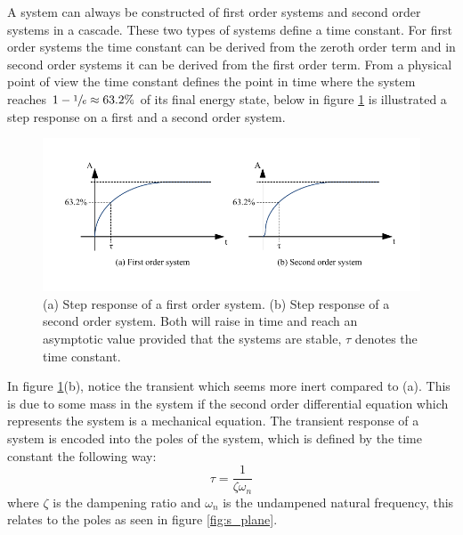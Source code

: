 A system can always be constructed of first order systems and second order systems in a cascade. These two types of systems define a time constant. For first order systems the time constant can be derived from the zeroth order term and in second order systems it can be derived from the first order term. From a physical point of view the time constant defines the point in time where the system reaches $1 - \sfrac{1}{e} \approx 63.2\%$ of its final energy state, below in figure \ref{fig:energy_systems} is illustrated a step response on a first and a second order system.
\begin{figure}[htb]
	\centering
	\includegraphics[scale=1,trim=0 0 0 0]{graphics/energy_systems.pdf} %
	\caption{(a) Step response of a first order system. (b) Step response of a second order system. Both will raise in time and reach an asymptotic value provided that the systems are stable, $\tau$ denotes the time constant.}
	\label{fig:energy_systems}			%
\end{figure}
In figure \ref{fig:energy_systems}(b), notice the transient which seems more inert compared to (a). This is due to some mass in the system if the second order differential equation which represents the system is a mechanical equation. The transient response of a system is encoded into the poles of the system, which is defined by the time constant the following way:
\begin{equation}
	\tau = \frac{1}{\zeta\omega_{n}}\label{eq:time_constant}
\end{equation}
where $\zeta$ is the dampening ratio and $\omega_{n}$ is the undampened natural frequency, this relates to the poles as seen in figure \ref{fig:s_plane}.
